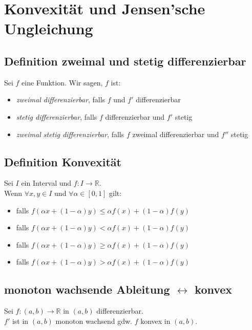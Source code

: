 \documentclass[halfparscip]{scrartcl}
\newcounter{subsection2}
\begin{document}
\setcounter{subsection2}{\value{subsection}}
\section*{Konvexität und Jensen'sche Ungleichung}
\setcounter{subsection}{\value{subsection2}}

\addtocounter{subsection}{2}
\subsection{Definition zweimal und stetig differenzierbar}
Sei $f$ eine Funktion. Wir sagen, $f$ ist:
\begin{itemize}
	\item \textit{zweimal differenzierbar}, falls $f$ und $f'$ differenzierbar
	\item \textit{stetig differenzierbar}, falls $f$ differenzierbar und $f'$ stetig
	\item \textit{zweimal stetig differenzierbar}, falls $f$ zweimal differenzierbar und $f''$ stetig
\end{itemize}

\addtocounter{subsection}{3}
\subsection{Definition Konvexität}
Sei $I$ ein Interval und $f : I \rightarrow \mathbb{R}$.\\
Wenn $\forall x,y \in I$ und $\forall \alpha \in [0,1]$ gilt:
\begin{itemize}
	\item {} falls $f(\alpha x + (1 - \alpha)y) \leq \alpha f(x) + (1 - \alpha)f(y)$
	\item {} falls $f(\alpha x + (1 - \alpha)y) < \alpha f(x) + (1 - \alpha)f(y)$
	\item {} falls $f(\alpha x + (1 - \alpha)y) \geq \alpha f(x) + (1 - \alpha)f(y)$
	\item {} falls $f(\alpha x + (1 - \alpha)y) > \alpha f(x) + (1 - \alpha)f(y)$
\end{itemize}

\addtocounter{subsection}{-2}
\subsection{monoton wachsende Ableitung $\leftrightarrow$ konvex}
Sei $f: (a,b) \rightarrow \mathbb{R}$ in $(a,b)$ differenzierbar.\\
$f'$ ist in $(a,b)$ monoton wachsend gdw. $f$ konvex in $(a,b)$.
\end{document}
